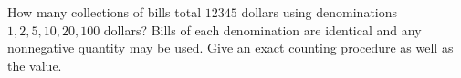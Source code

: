 How many collections of bills total $12345$ dollars using denominations $1,2,5,10,20,100$ dollars? Bills of each denomination are identical and any nonnegative quantity may be used. Give an exact counting procedure as well as the value.
